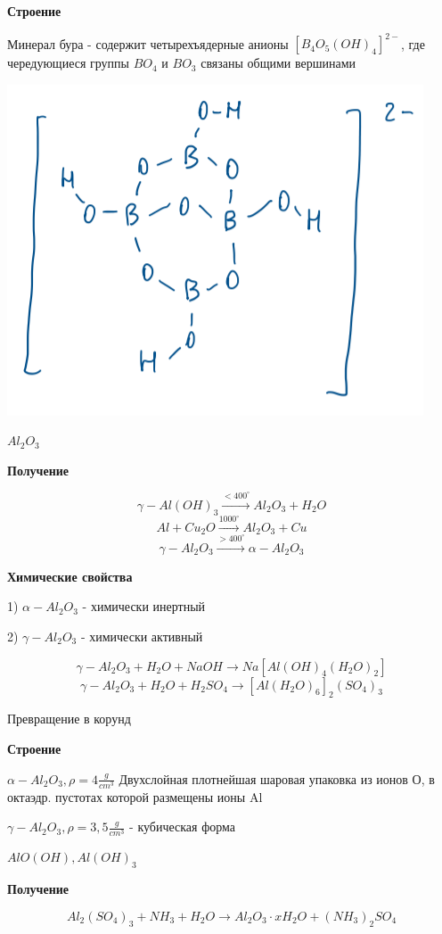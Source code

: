 \documentclass[14pt,a4paper]{scrartcl}
\begin{document}
\textbf{Строение}

Минерал бура - содержит четырехъядерные анионы $[B_4O_5(OH)_4]^{2-}$, где чередующиеся группы $BO_4$ и $BO_3$ связаны общими вершинами

\includegraphics{11v7.png}

$Al_2O_3$

\textbf{Получение}

$$\gamma-Al(OH)_3 \xrightarrow{<400^{\circ}} Al_2O_3 + H_2O$$
$$Al + Cu_2O \xrightarrow{1000^{\circ}} Al_2O_3 + Cu$$
$$\gamma-Al_2O_3 \xrightarrow{>400^{\circ}} \alpha-Al_2O_3$$

\textbf{Химические свойства}

1) $\alpha-Al_2O_3$ - химически инертный

2) $\gamma-Al_2O_3$ - химически активный

$$\gamma-Al_2O_3 + H_2O + NaOH \rightarrow Na[Al(OH)_4(H_2O)_2]$$
$$\gamma-Al_2O_3 + H_2O + H_2SO_4 \rightarrow [Al(H_2O)_6]_2(SO_4)_3$$

Превращение в корунд

\textbf{Строение}

$\alpha-Al_2O_3,\rho = 4 \frac{g}{cm^3}$
Двухслойная плотнейшая шаровая упаковка из ионов О, в октаэдр. пустотах которой размещены ионы Al

$\gamma-Al_2O_3, \rho = 3,5 \frac{g}{cm^3}$ - кубическая форма

$AlO(OH), Al(OH)_3$

\textbf{Получение}

$$Al_2(SO_4)_3 + NH_3 + H_2O \rightarrow Al_2O_3\cdot xH_2O + (NH_3)_2SO_4$$
\end{document}
